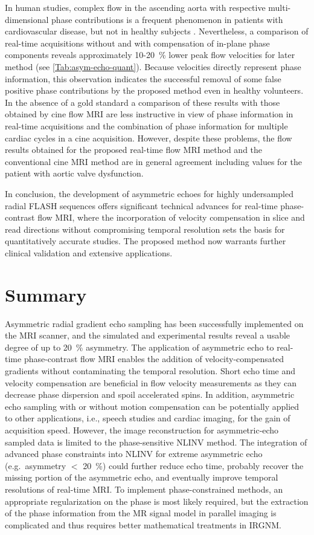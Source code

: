 In human studies, complex flow in the ascending aorta with respective multi-dimensional phase contributions is a frequent phenomenon in patients with cardiovascular disease, but not in healthy subjects \cite{2012_PC_Joseph,2014_PC_Joseph}. Nevertheless, a comparison of real-time acquisitions without and with compensation of in-plane phase components reveals approximately \num{10}-\SI{20}{\percent} lower peak flow velocities for later method (see \cref{Tab:asym-echo-quant}). Because velocities directly represent phase information, this observation indicates the successful removal of some false positive phase contributions by the proposed method even in healthy volunteers. In the absence of a gold standard a comparison of these results with those obtained by cine flow MRI are less instructive in view of phase information in real-time acquisitions and the combination of phase information for multiple cardiac cycles in a cine acquisition. However, despite these problems, the flow results obtained for the proposed real-time flow MRI method and the conventional cine MRI method are in general agreement including values for the patient with aortic valve dysfunction.

In conclusion, the development of asymmetric echoes for highly undersampled radial FLASH sequences offers significant technical advances for real-time phase-contrast flow MRI, where the incorporation of velocity compensation in slice and read directions without compromising temporal resolution sets the basis for quantitatively accurate studies. The proposed method now warrants further clinical validation and extensive applications.

\section{Summary}
Asymmetric radial gradient echo sampling has been successfully implemented on the MRI scanner, and the simulated and experimental results reveal a usable degree of up to \SI{20}{\percent} asymmetry. The application of asymmetric echo to real-time phase-contrast flow MRI enables the addition of velocity-compensated gradients without contaminating the temporal resolution. Short echo time and velocity compensation are beneficial in flow velocity measurements as they can decrease phase dispersion and spoil accelerated spins. In addition, asymmetric echo sampling with or without motion compensation can be potentially applied to other applications, i.e., speech studies and cardiac imaging, for the gain of acquisition speed. However, the image reconstruction for asymmetric-echo sampled data is limited to the phase-sensitive NLINV method. The integration of advanced phase constraints into NLINV for extreme asymmetric echo (e.g.~asymmetry $<$ \SI{20}{\percent}) could further reduce echo time, probably recover the missing portion of the asymmetric echo, and eventually improve temporal resolutions of real-time MRI. To implement phase-constrained methods, an appropriate regularization on the phase is most likely required, but the extraction of the phase information from the MR signal model in parallel imaging is complicated and thus requires better mathematical treatments in IRGNM.


